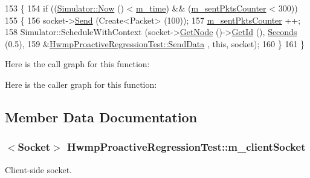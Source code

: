 \begin{DoxyCode}
153 \{
154   \textcolor{keywordflow}{if} ((\hyperlink{group__simulator_gac3635e2e87f7ce316c89290ee1b01d0d}{Simulator::Now} () < \hyperlink{classHwmpProactiveRegressionTest_a3763ac5b8a1a360d2389fad7d0049965}{m\_time}) && (\hyperlink{classHwmpProactiveRegressionTest_a3f8d8f416c6dc2d7ddeb21963f526dbd}{m\_sentPktsCounter} < 300))
155     \{
156       socket->\hyperlink{classns3_1_1Socket_a036901c8f485fe5b6eab93b7f2ec289d}{Send} (Create<Packet> (100));
157       \hyperlink{classHwmpProactiveRegressionTest_a3f8d8f416c6dc2d7ddeb21963f526dbd}{m\_sentPktsCounter} ++;
158       Simulator::ScheduleWithContext (socket->\hyperlink{classns3_1_1Socket_aba642ad4301c1df47befc0aa9afa2e48}{GetNode} ()->\hyperlink{classns3_1_1Node_aaf49b64a843565ce3812326313b370ac}{GetId} (), 
      \hyperlink{group__timecivil_ga33c34b816f8ff6628e33d5c8e9713b9e}{Seconds} (0.5),
159                                       &\hyperlink{classHwmpProactiveRegressionTest_a0277f83b87ead8955c6767a0c3d2dcce}{HwmpProactiveRegressionTest::SendData}
      , \textcolor{keyword}{this}, socket);
160     \}
161 \}
\end{DoxyCode}


Here is the call graph for this function\+:




Here is the caller graph for this function\+:




\subsection{Member Data Documentation}
\subsubsection[{\texorpdfstring{m\+\_\+client\+Socket}{m_clientSocket}}]{$<${\bf Socket}$>$ Hwmp\+Proactive\+Regression\+Test\+::m\+\_\+client\+Socket\hspace{0.3cm}{\ttfamily [private]}}\hypertarget{classHwmpProactiveRegressionTest_a288f0ba7fb1195e7cdc570db2c3db58e}{}\label{classHwmpProactiveRegressionTest_a288f0ba7fb1195e7cdc570db2c3db58e}


Client-\/side socket. 

